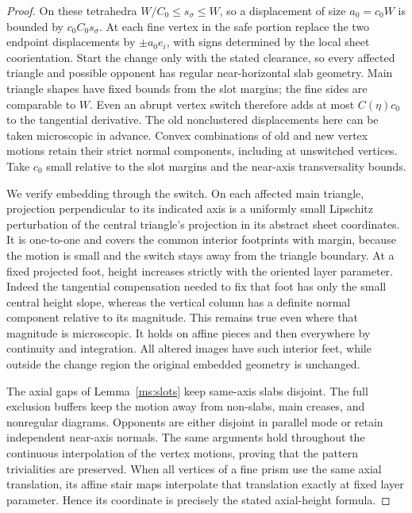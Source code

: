 \begin{proof}
On these tetrahedra $W/C_0\le s_\sigma\le W$, so a displacement
of size $a_0=c_0W$ is bounded by $c_0C_0s_\sigma$.
At each fine vertex in the safe portion replace the two endpoint
displacements by $\pm a_0e_i$, with signs determined by the local
sheet coorientation.  Start the change only with the stated
clearance, so every affected triangle and possible opponent has
regular near-horizontal slab geometry.  Main triangle shapes
have fixed bounds from the slot margins; the fine sides are
comparable to $W$.  Even an abrupt vertex switch therefore adds
at most $C(\eta)c_0$ to the tangential derivative.  The old
nonclustered displacements here can be taken microscopic in
advance.  Convex combinations of old and new vertex motions
retain their strict normal components, including at unswitched
vertices.  Take $c_0$ small relative to the slot margins and the
near-axis transversality bounds.

We verify embedding through the switch.  On each affected main
triangle, projection perpendicular to its indicated axis is a
uniformly small Lipschitz perturbation of the central triangle's
projection in its abstract sheet coordinates.  It is one-to-one
and covers the common interior footprints with margin, because
the motion is small and the switch stays away from the triangle
boundary.  At a fixed projected foot, height increases strictly
with the oriented layer parameter.  Indeed the tangential
compensation needed to fix that foot has only the small central
height slope, whereas the vertical column has a definite normal
component relative to its magnitude.  This remains true even
where that magnitude is microscopic.  It holds on affine pieces
and then everywhere by continuity and integration.  All altered
images have such interior feet, while outside the change region
the original embedded geometry is unchanged.

The axial gaps of Lemma~\ref{ms:slots} keep same-axis slabs disjoint.
The full exclusion buffers keep the motion away from non-slabs,
main creases, and nonregular diagrams.  Opponents are either
disjoint in parallel mode or retain independent near-axis
normals.  The same arguments hold throughout the continuous
interpolation of the vertex motions, proving that the pattern
trivialities are preserved.  When all vertices of a fine prism
use the same axial translation, its affine stair maps interpolate
that translation exactly at fixed layer parameter.  Hence its
coordinate is precisely the stated axial-height formula.
\end{proof}
